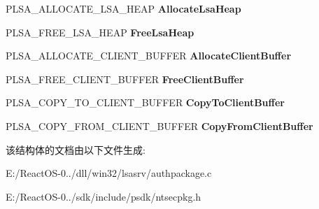 \begin{DoxyCompactItemize}
P\+L\+S\+A\+\_\+\+A\+L\+L\+O\+C\+A\+T\+E\+\_\+\+L\+S\+A\+\_\+\+H\+E\+AP {\bfseries Allocate\+Lsa\+Heap}
\item 
\mbox{\label{struct_l_s_a___d_i_s_p_a_t_c_h___t_a_b_l_e_af653b8c24bd68b56bab27879cd170405}} 
P\+L\+S\+A\+\_\+\+F\+R\+E\+E\+\_\+\+L\+S\+A\+\_\+\+H\+E\+AP {\bfseries Free\+Lsa\+Heap}
\item 
\mbox{\label{struct_l_s_a___d_i_s_p_a_t_c_h___t_a_b_l_e_a25819da209ef622e383a032a1fdb82be}} 
P\+L\+S\+A\+\_\+\+A\+L\+L\+O\+C\+A\+T\+E\+\_\+\+C\+L\+I\+E\+N\+T\+\_\+\+B\+U\+F\+F\+ER {\bfseries Allocate\+Client\+Buffer}
\item 
\mbox{\label{struct_l_s_a___d_i_s_p_a_t_c_h___t_a_b_l_e_a40b7b56e968d59912a734b8b60186137}} 
P\+L\+S\+A\+\_\+\+F\+R\+E\+E\+\_\+\+C\+L\+I\+E\+N\+T\+\_\+\+B\+U\+F\+F\+ER {\bfseries Free\+Client\+Buffer}
\item 
\mbox{\label{struct_l_s_a___d_i_s_p_a_t_c_h___t_a_b_l_e_abfd58e58ada85157208bf534779706ce}} 
P\+L\+S\+A\+\_\+\+C\+O\+P\+Y\+\_\+\+T\+O\+\_\+\+C\+L\+I\+E\+N\+T\+\_\+\+B\+U\+F\+F\+ER {\bfseries Copy\+To\+Client\+Buffer}
\item 
\mbox{\label{struct_l_s_a___d_i_s_p_a_t_c_h___t_a_b_l_e_a5b7776ebf6353dd0f69321d5f021afe4}} 
P\+L\+S\+A\+\_\+\+C\+O\+P\+Y\+\_\+\+F\+R\+O\+M\+\_\+\+C\+L\+I\+E\+N\+T\+\_\+\+B\+U\+F\+F\+ER {\bfseries Copy\+From\+Client\+Buffer}
\end{DoxyCompactItemize}


该结构体的文档由以下文件生成\+:\begin{DoxyCompactItemize}
\item 
E\+:/\+React\+O\+S-\/0../dll/win32/lsasrv/authpackage.\+c\item 
E\+:/\+React\+O\+S-\/0../sdk/include/psdk/ntsecpkg.\+h\end{DoxyCompactItemize}
